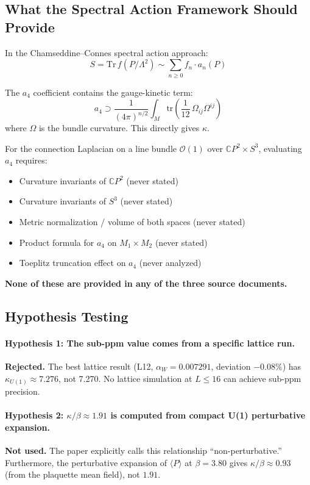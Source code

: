 \documentclass[12pt,a4paper]{article}
\begin{document}
\subsection{What the Spectral Action Framework Should Provide}

In the Chamseddine--Connes spectral action approach:
\begin{equation}
S = \text{Tr}\,f(P/\Lambda^2) \sim \sum_{n \geq 0} f_n \cdot a_n(P)
\end{equation}

The $a_4$ coefficient contains the gauge-kinetic term:
\begin{equation}
a_4 \supset \frac{1}{(4\pi)^{n/2}} \int_M
\text{tr}\!\left(\frac{1}{12}\,\Omega_{ij}\Omega^{ij}\right)
\end{equation}
where $\Omega$ is the bundle curvature. This directly gives $\kappa$.

For the connection Laplacian on a line bundle $\mathcal{O}(1)$ over
$\mathbb{C}P^2 \times S^3$, evaluating $a_4$ requires:
\begin{itemize}
\item Curvature invariants of $\mathbb{C}P^2$ (never stated)
\item Curvature invariants of $S^3$ (never stated)
\item Metric normalization / volume of both spaces (never stated)
\item Product formula for $a_4$ on $M_1 \times M_2$ (never stated)
\item Toeplitz truncation effect on $a_4$ (never analyzed)
\end{itemize}

\textbf{None of these are provided in any of the three source documents.}

\subsection{Hypothesis Testing}

\paragraph{Hypothesis 1: The sub-ppm value comes from a specific lattice run.}
\textbf{Rejected.} The best lattice result (L12, $\alpha_W = 0.007291$,
deviation $-0.08\%$) has $\kappa_{U(1)} \approx 7.276$, not 7.270.
No lattice simulation at $L \leq 16$ can achieve sub-ppm precision.

\paragraph{Hypothesis 2: $\kappa/\beta \approx 1.91$ is computed from
compact U(1) perturbative expansion.}
\textbf{Not used.} The paper explicitly calls this relationship
``non-perturbative.'' Furthermore, the perturbative expansion of
$\langle P \rangle$ at $\beta = 3.80$ gives $\kappa/\beta \approx 0.93$
(from the plaquette mean field), not $1.91$.
\end{document}
